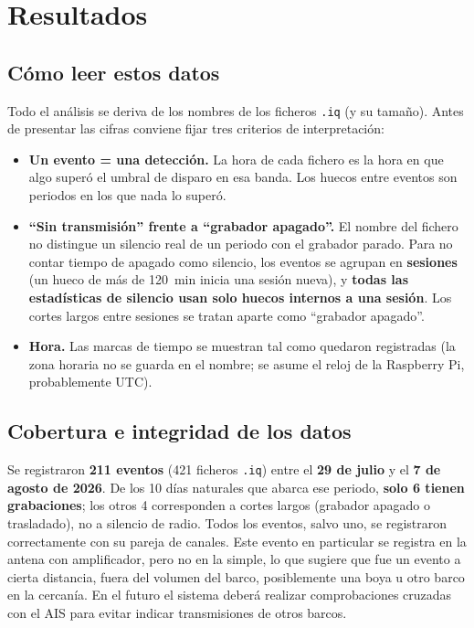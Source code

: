 \section{Resultados}

\subsection{Cómo leer estos datos}

Todo el análisis se deriva de los nombres de los ficheros \texttt{.iq} (y su tamaño). Antes de presentar las cifras conviene fijar tres criterios de interpretación:

\begin{itemize}
    \item \textbf{Un evento = una detección.} La hora de cada fichero es la hora en que algo superó el umbral de disparo en esa banda. Los huecos entre eventos son periodos en los que nada lo superó.
    \item \textbf{``Sin transmisión'' frente a ``grabador apagado''.} El nombre del fichero no distingue un silencio real de un periodo con el grabador parado. Para no contar tiempo de apagado como silencio, los eventos se agrupan en \textbf{sesiones} (un hueco de más de \SI{120}{\minute} inicia una sesión nueva), y \textbf{todas las estadísticas de silencio usan solo huecos internos a una sesión}. Los cortes largos entre sesiones se tratan aparte como ``grabador apagado''.
    \item \textbf{Hora.} Las marcas de tiempo se muestran tal como quedaron registradas (la zona horaria no se guarda en el nombre; se asume el reloj de la Raspberry Pi, probablemente UTC).
\end{itemize}

\subsection{Cobertura e integridad de los datos}

Se registraron \textbf{211 eventos} (421 ficheros \texttt{.iq}) entre el \textbf{29 de julio} y el \textbf{7 de agosto de 2026}. De los 10 días naturales que abarca ese periodo, \textbf{solo 6 tienen grabaciones}; los otros 4 corresponden a cortes largos (grabador apagado o trasladado), no a silencio de radio. Todos los eventos, salvo uno, se registraron correctamente con su pareja de canales. Este evento en particular se registra en la antena con amplificador, pero no en la simple, lo que sugiere que fue un evento a cierta distancia, fuera del volumen del barco, posiblemente una boya u otro barco en la cercanía. En el futuro el sistema deberá realizar comprobaciones cruzadas con el AIS para evitar indicar transmisiones de otros barcos.

